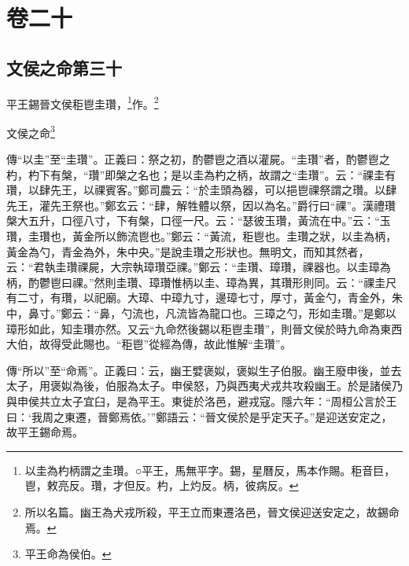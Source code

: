 

\chapter{卷二十}


\section{文侯之命第三十}


平王錫晉文侯秬鬯圭瓚，\footnote{以圭為杓柄謂之圭瓚。○平王，馬無平字。錫，星曆反，馬本作賜。秬音巨，鬯，敕亮反。瓚，才但反。杓，上灼反。柄，彼病反。}作。\footnote{所以名篇。幽王為犬戎所殺，平王立而東遷洛邑，晉文侯迎送安定之，故錫命焉。}

文侯之命\footnote{平王命為侯伯。}

{\noindent\zhuan{}\fzbyks 傳“以圭”至“圭瓚”。正義曰：祭之初，酌鬱鬯之酒以灌屍。“圭瓚”者，酌鬱鬯之杓，杓下有槃，“瓚”即槃之名也；是以圭為杓之柄，故謂之“圭瓚”。云：“祼圭有瓚，以肆先王，以祼賓客。”鄭司農云：“於圭頭為器，可以挹鬯祼祭謂之瓚。以肆先王，灌先王祭也。”鄭玄云：“肆，解牲體以祭，因以為名。”爵行曰“祼”。漢禮瓚槃大五升，口徑八寸，下有槃，口徑一尺。云：“瑟彼玉瓚，黃流在中。”云：“玉瓚，圭瓚也，黃金所以飾流鬯也。”鄭云：“黃流，秬鬯也。圭瓚之狀，以圭為柄，黃金為勺，青金為外，朱中央。”是說圭瓚之形狀也。無明文，而知其然者，云：“君執圭瓚祼屍，大宗執璋瓚亞祼。”鄭云：“圭瓚、璋瓚，祼器也。以圭璋為柄，酌鬱鬯曰祼。”然則圭瓚、璋瓚惟柄以圭、璋為異，其瓚形則同。云：“祼圭尺有二寸，有瓚，以祀廟。大璋、中璋九寸，邊璋七寸，厚寸，黃金勺，青金外，朱中，鼻寸。”鄭云：“鼻，勺流也，凡流皆為龍口也。三璋之勺，形如圭瓚。”是鄭以璋形如此，知圭瓚亦然。又云“九命然後錫以秬鬯圭瓚”，則晉文侯於時九命為東西大伯，故得受此賜也。“秬鬯”從經為傳，故此惟解“圭瓚”。 \par}

{\noindent\zhuan{}\fzbyks 傳“所以”至“命焉”。正義曰：云，幽王嬖褒姒，褒姒生子伯服。幽王廢申後，並去太子，用褒姒為後，伯服為太子。申侯怒，乃與西夷犬戎共攻殺幽王。於是諸侯乃與申侯共立太子宜臼，是為平王。東徙於洛邑，避戎寇。隱六年：“周桓公言於王曰：‘我周之東遷，晉鄭焉依。’”鄭語云：“晉文侯於是乎定天子。”是迎送安定之，故平王錫命焉。 \par}

